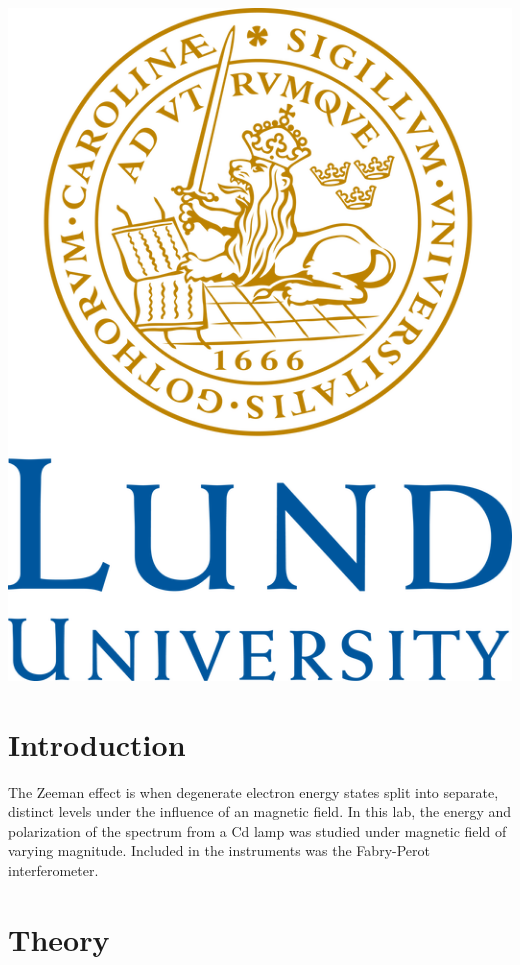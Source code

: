 \documentclass[12pt]{article}
\begin{document}
\begin{titlepage}
\includegraphics[scale=2.8]{logo.png}\\[1cm] 

 


\vfill 

\end{titlepage}

\section{Introduction}
The Zeeman effect is when degenerate electron energy states split into separate, distinct levels under the influence of an magnetic field. In this lab, the energy and polarization of the spectrum from a Cd lamp was studied under magnetic field of varying magnitude. Included in the instruments was the Fabry-Perot interferometer.

\section{Theory}
\end{document}

